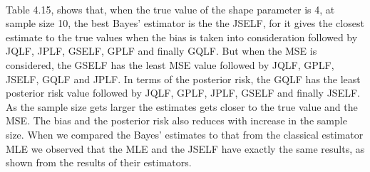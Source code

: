 \documentclass[a4paper,12pt]{report}
\begin{document}
{\begin{minipage}{\linewidth}
		
\end{minipage}\\


\indent Table 4.15, shows that, when the true value of the shape parameter is 4, at sample size 10, the best Bayes’ estimator is the the JSELF, for it gives the closest estimate to the true values when the bias is taken into consideration followed by JQLF, JPLF, GSELF, GPLF and finally GQLF. But when the MSE is considered, the GSELF has the least MSE value followed by JQLF, GPLF, JSELF, GQLF and JPLF. In terms of the posterior risk, the GQLF has the least posterior risk value followed by JQLF, GPLF, JPLF, GSELF and finally JSELF. As the sample size gets larger the estimates gets closer to the true value and the MSE. The bias and the posterior risk also reduces with increase in the sample size. When we compared the Bayes’ estimates to that from the classical estimator MLE we observed that the MLE and the JSELF have exactly the same results, as shown from the results of their estimators.\\

}
\end{document}
